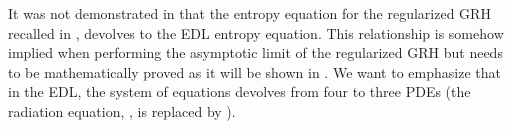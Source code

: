 \documentclass[times,doublespace]{fldauth}%
\begin{document}
%
It was not demonstrated in \cite{our_jcp_radhy_paper} that the entropy equation for the regularized GRH recalled in , devolves to the EDL entropy equation. This relationship is somehow implied when performing the asymptotic limit of the regularized GRH but needs to be mathematically proved as it will be shown in . We want to emphasize that in the EDL, the system of equations devolves from four to three PDEs (the radiation equation, , is replaced by ).
%
\end{document}
